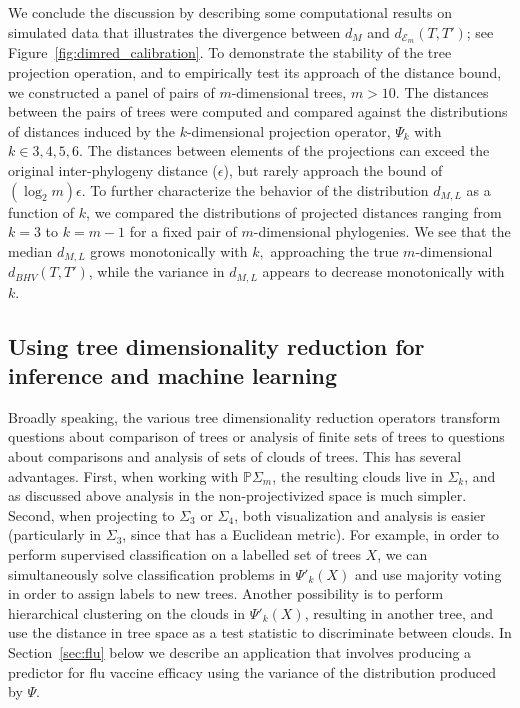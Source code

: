 \documentclass[a4paper,11pt]{article}
\newcommand{\aE}{\mathcal{E}}
\begin{document}
We conclude the discussion by describing some computational results on
simulated data that illustrates the divergence between $d_M$ and
$d_{\aE_m}(T,T')$; see Figure~\ref{fig:dimred_calibration}.  To
demonstrate the stability of the tree projection operation, and to
empirically test its approach of the distance bound, we constructed a
panel of pairs of $m$-dimensional trees, $m > 10$.  The distances
between the pairs of trees were computed and compared against the
distributions of distances induced by the $k$-dimensional projection
operator, $\Psi_k$ with $k \in {3,4,5,6}$.  The distances between
elements of the projections can exceed the original inter-phylogeny
distance ($\epsilon$), but rarely approach the bound of $(\log_2
m)\epsilon$.  To further characterize the behavior of the distribution
$d_{M,L}$ as a function of $k$, we compared the distributions of
projected distances ranging from $k=3$ to $k=m-1$ for a fixed pair of
$m$-dimensional phylogenies.  We see that the median $d_{M,L}$ grows
monotonically with $k,$ approaching the true $m$-dimensional
$d_{BHV}(T, T')$, while the variance in $d_{M,L}$ appears to decrease
monotonically with $k$.

\subsection{Using tree dimensionality reduction for inference and machine learning}

Broadly speaking, the various tree dimensionality reduction operators transform questions about comparison of trees or analysis of finite sets of trees to questions about comparisons and analysis of sets of clouds of trees.
This has several advantages.
First, when working with $\mathbb{P}\Sigma_m$, the resulting clouds live in $\Sigma_k$, and as discussed above analysis in the non-projectivized space is much simpler.
Second, when projecting to $\Sigma_3$ or $\Sigma_4$, both visualization and analysis is easier (particularly in $\Sigma_3$, since that has a Euclidean metric).
For example, in order to perform supervised classification on a labelled set of trees $X$, we can simultaneously solve classification problems in $\Psi'_k(X)$ and use majority voting in order to assign labels to new trees.
Another possibility is to perform hierarchical clustering on the
clouds in $\Psi'_k(X)$, resulting in another tree, and use the
distance in tree space as a test statistic to discriminate between
clouds.
In Section~\ref{sec:flu} below we describe an application that
involves producing a predictor for flu vaccine efficacy using the
variance of the distribution produced by $\Psi$.
\end{document}
